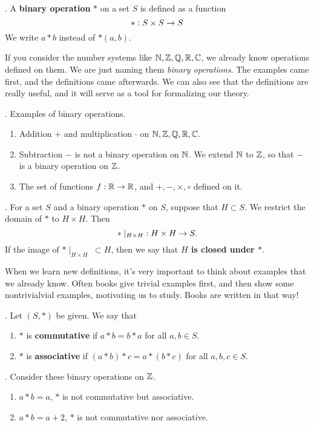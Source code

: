 
.  A \textbf{binary operation} \(*\) on a set \(S\) is defined as a function
\[
    *: S \times S \rightarrow S
\]
We write \(a * b\) instead of \(*(a, b)\).

\rmk If you consider the number systems like \(\mathbb{N}, \mathbb{Z}, \mathbb{Q}, \mathbb{R}, \mathbb{C}\), we already know operations defined on them. We are just naming them \textit{binary operations}. The examples came first, and the definitions came afterwards. We can also see that the definitions are really useful, and it will serve as a tool for formalizing our theory.

\ex. Examples of binary operations.
\begin{enumerate}
    \item Addition \(+\) and multiplication \(\cdot\) on \(\mathbb{N}, \mathbb{Z}, \mathbb{Q}, \mathbb{R}, \mathbb{C}\).
    \item Subtraction \(-\) is not a binary operation on \(\mathbb{N}\). We extend \(\mathbb{N}\) to \(\mathbb{Z}\), so that \(-\) is a binary operation on \(\mathbb{Z}\).
    \item The set of functions \(f: \mathbb{R} \rightarrow \mathbb{R}\), and \(+, -, \times, \circ\) defined on it.
\end{enumerate}

.  For a set \(S\) and a binary operation \(*\) on \(S\), suppose that \(H \subset S\). We restrict the domain of \(*\) to \(H \times H\). Then
\[
    *\mid_{H\times H} \;: H\times H \rightarrow S.
\]
If the image of \(*\mid_{H\times H} \;\subset H\), then we say that \textbf{\(H\) is closed under \(*\)}.

\rmk When we learn new definitions, it's very important to think about examples that we already know. Often books give trivial examples first, and then show some nontrivialvial examples, motivating us to study. Books are written in that way!

. Let \((S, *)\) be given. We say that
\begin{enumerate}
    \item \(*\) is \textbf{commutative} if \(a * b = b * a\) for all \(a, b \in S\).
    \item \(*\) is \textbf{associative} if \((a * b)* c = a * (b * c)\) for all \(a, b, c \in S\).
\end{enumerate}

\ex. Consider these binary operations on \(\mathbb{Z}\).
\begin{enumerate}
    \item \(a * b = a\), \(*\) is not commutative but associative.
    \item \(a * b = a + 2\), \(*\) is not commutative nor associative.
\end{enumerate}

